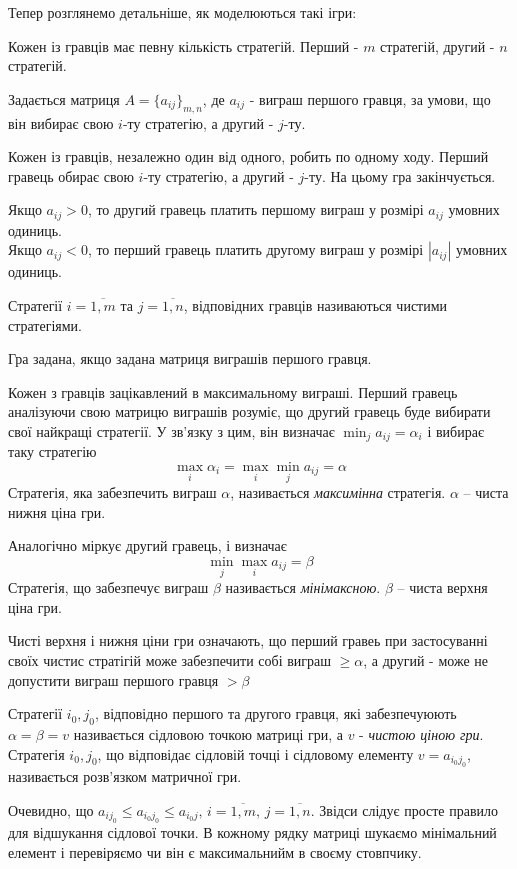 \documentclass[12pt,a4paper]{book}
\begin{document}
Тепер розглянемо детальніше, як моделюються такі ігри:

Кожен із гравців має певну кількість стратегій. Перший - $m$ стратегій, другий - $n$ стратегій.

Задається матриця $A=\{a_{ij}\}_{m, n}$, де $a_{ij}$ - виграш першого гравця, за умови, що він вибирає свою $i$-ту стратегію, а другий - $j$-ту.

Кожен із гравців, незалежно один від одного, робить по одному ходу. Перший гравець обирає свою $i$-ту стратегію, а другий - $j$-ту. На цьому гра закінчується.

Якщо $a_{ij}>0$, то другий гравець платить першому виграш у розмірі $a_{ij}$ умовних одиниць.\\
Якщо $a_{ij}<0$, то перший гравець платить другому виграш у розмірі $|a_{ij}|$ умовних одиниць.

Стратегії $i=\overline{1, m}$ та $j=\overline{1, n}$, відповідних гравців називаються чистими стратегіями.

Гра задана, якщо задана матриця виграшів першого гравця.

Кожен з гравців зацікавлений в максимальному виграші. Перший гравець аналізуючи свою матрицю виграшів розуміє, що другий гравець буде вибирати свої найкращі стратегії. У зв'язку з цим, він визначає $\displaystyle \min_j a_{ij} = \alpha_i$ і вибирає таку стратегію
\begin{equation}
	\max_i \alpha_i = \max_i \min_j a_{ij} = \alpha
\end{equation}
Стратегія, яка забезпечить виграш $\alpha$, називається \emph{максимінна} стратегія. $\alpha$ -- чиста нижня ціна гри.

Аналогічно міркує другий гравець, і визначає
\[
	\min_j \max_i a_{ij} = \beta
\]
Стратегія, що забезпечує виграш $\beta$ називається \emph{мінімаксною}. $\beta$ -- чиста верхня ціна гри.

Чисті верхня і нижня ціни гри означають, що перший гравеь при застосуванні своїх чистис стратігій може забезпечити собі виграш $\ge\alpha$, а другий - може не допустити виграш першого гравця $>\beta$

Стратегії $i_0, j_0$, відповідно першого та другого гравця, які забезпечуюють $\alpha = \beta = v$ називається сідловою точкою матриці гри, а $v$ - \emph{чистою ціною гри}.
Стратегія $i_0, j_0$, що відповідає сідловій точці і сідловому елементу $v=a_{i_0j_0}$, називається розв'язком матричної гри.

Очевидно, що $a_{ij_0} \le a_{i_0j_0} \le a_{i_0j},\,i=\overline{1, m},\,j=\overline{1, n}$. Звідси слідує просте правило для відшукання сідлової точки. В кожному рядку матриці шукаємо мінімальний елемент і перевіряємо чи він є максимальнийм в своєму стовпчику.
\end{document}
